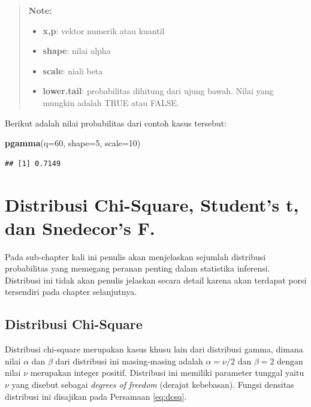 \documentclass[]{book}
\newenvironment{Shaded}{\begin{snugshade}}{\end{snugshade}}
\newcommand{\KeywordTok}[1]{\textcolor[rgb]{0.13,0.29,0.53}{\textbf{#1}}}
\newcommand{\DataTypeTok}[1]{\textcolor[rgb]{0.13,0.29,0.53}{#1}}
\newcommand{\DecValTok}[1]{\textcolor[rgb]{0.00,0.00,0.81}{#1}}
\newcommand{\NormalTok}[1]{#1}
\providecommand{\tightlist}{%
  \setlength{\itemsep}{0pt}\setlength{\parskip}{0pt}}
\begin{document}
\begin{quote}
\textbf{Note: }

\begin{itemize}
\tightlist
\item
  \textbf{x,p}: vektor numerik atau kuantil
\item
  \textbf{shape}: nilai alpha
\item
  \textbf{scale}: niali beta
\item
  \textbf{lower.tail}: probabilitas dihitung dari ujung bawah. Nilai
  yang mungkin adalah TRUE atau FALSE.
\end{itemize}
\end{quote}

Berikut adalah nilai probabilitas dari contoh kasus tersebut:

\begin{Shaded}
\begin{Highlighting}[]
\KeywordTok{pgamma}\NormalTok{(}\DataTypeTok{q=}\DecValTok{60}\NormalTok{, }\DataTypeTok{shape=}\DecValTok{5}\NormalTok{, }\DataTypeTok{scale=}\DecValTok{10}\NormalTok{)}
\end{Highlighting}
\end{Shaded}

\begin{verbatim}
## [1] 0.7149
\end{verbatim}

\section{Distribusi Chi-Square, Student's t, dan Snedecor's
F.}\label{distribusi-chi-square-students-t-dan-snedecors-f.}

Pada sub-chapter kali ini penulis akan menjelaskan sejumlah distribusi
probabilitas yang memegang peranan penting dalam statistika inferensi.
Distribusi ini tidak akan penulis jelaskan secara detail karena akan
terdapat porsi tersendiri pada chapter selanjutnya.

\subsection{Distribusi Chi-Square}\label{distribusi-chi-square}

Distribusi chi-square merupakan kasus khusu lain dari distribusi gamma,
dimana nilai \(\alpha\) dan \(\beta\) dari distribusi ini masing-masing
adalah \(\alpha=\nu/2\) dan \(\beta=2\) dengan nilai \(\nu\) merupakan
integer positif. Distribusi ini memiliki parameter tunggal yaitu \(\nu\)
yang disebut sebagai \emph{degrees of freedom} (derajat kebebasan).
Fungsi densitas distribusi ini disajikan pada Persamaan \eqref{eq:dcsq}.
\end{document}
